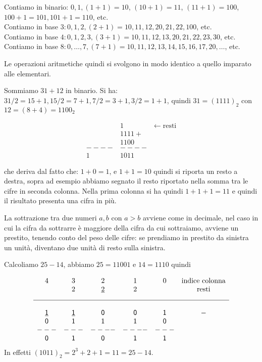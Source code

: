 \begin{ex}
Contiamo in binario: $0, 1, (1+1) = 10$, $(10+1) = 11$, $(11+1) = 100$,
$100+1 = 101, 101+1 = 110$, etc.\\
Contiamo in base $3: 0,1,2,(2+1)=10,11,12,20,21,22,100$, etc.\\
Contiamo in base $4: 0,1,2,3, (3+1) = 10, 11,12,13,20,21,22,23,30$, etc.\\
Contiamo in base $8: 0,\ldots,7, (7+1)=10,11,12,13,14,15,16,17,20,\ldots$, etc.
\end{ex}
Le operazioni aritmetiche quindi si svolgono in modo identico a quello imparato
alle elementari.

\begin{ex}\label{ex:somma} 
Sommiamo $31+12$ in binario. Si ha: $31/2 = 15 + 1, 15/2 = 7 + 1, 7/2 = 3 + 1, 3 /2 = 1 + 1$, quindi $31 = (1111)_2$ con $12 = (8+4) = 1100_2$

\begin{align*}
    &1\qquad \qquad \leftarrow\text{resti}\\
	&1111+\\
	&1100\\
----&----\\
   1&1011   
\end{align*}
\end{ex}

che deriva dal fatto che: $1+0 = 1$, e $1+1 = 10$ quindi si riporta un resto
a destra, sopra ad esempio abbiamo segnato il resto riportato nella somma tra le cifre in seconda colonna. Nella prima colonna si ha quindi $1+1+1 = 11$ e quindi il risultato presenta una cifra in più. 

La sottrazione tra due numeri $a,b$ con $a>b$ avviene come in decimale, nel caso in cui la cifra da sottrarre è maggiore della cifra da cui sottraiamo, avviene un prestito, tenendo conto del peso delle cifre: se prendiamo in prestito da sinistra un unità, diventano due unità di resto sulla sinistra.

\begin{ex}
Calcoliamo $25-14$, abbiamo $25 = 11001$ e $14 = 1110$ quindi 

\[
\begin{matrix}
 4 & 3 &   2   & 1 & 0 & \text{indice colonna}\\
   & 2  & \underline{2} & 2 &   & \text{resti}\\[2ex]
\hline\\
 \underline{\mathsf 1} & \underline{\mathsf 1} & \mathsf 0  & \mathsf 0 & \mathsf 1 & \mathsf-\\
 \mathsf 0 & \mathsf 1 & \mathsf 1  & \mathsf 1 & \mathsf 0 & \\
---&---&----&----&---& \\
 \mathsf 0 & \mathsf 1 & \mathsf 0 & \mathsf 1 & \mathsf 1 &
\end{matrix}
\]
In effetti $(1011)_2 = 2^3+2+1 = 11 = 25-14$.
\end{ex}

